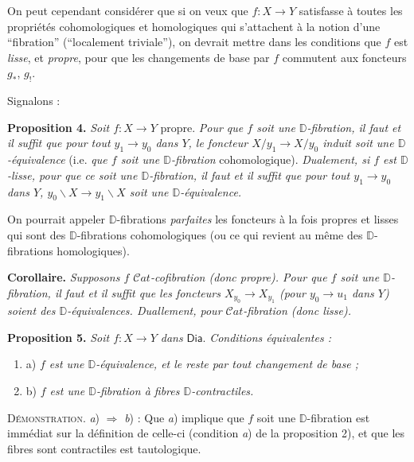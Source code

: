 \documentclass[11pt,leqno]{article}
\newcommand{\printedpage}[1]{\marginpar{\footnotesize p.~#1}}
\newcommand{\msp}[1]{\marginpar{\footnotesize [#1]}}
\newcommand{\DD}{\mathbb{D}}
\newcommand{\Dia}{\mathsf{Dia}}
\newcommand{\Cat}{\mathcal{C}at}
\begin{document}
\indent On peut cependant considérer que si on veux que $f : X \to Y$ satisfasse à toutes les propriétés cohomologiques et homologiques qui s'attachent à la notion d'une “fibration” (“localement triviale”), on devrait mettre dans les conditions que $f$ est \textit{lisse}, et \textit{propre}, pour que les changements de base par $f$ commutent aux foncteurs $g_*$, $g_!$. %

\printedpage{51}

\msp{page 83}

Signalons :

\textbf{Proposition 4.} \textit{Soit $f : X \to Y$} propre. \textit{Pour que $f$ soit une $\DD$-fibration, il faut et il suffit que pour tout $y_1 \to y_0$ dans $Y$, le foncteur $X/y_1 \to X/y_0$ induit soit une $\DD$-équivalence} (i.e. \textit{que $f$ soit une $\DD$-fibration} cohomologique). \textit{Dualement, si $f$ est $\DD$-lisse, pour que ce soit une $\DD$-fibration, il faut et il suffit que pour tout $y_1 \to y_0$ dans $Y$, $y_0\backslash X \to y_1\backslash X$ soit une $\DD$-équivalence.}

\indent On pourrait appeler $\DD$-fibrations \textit{parfaites} les foncteurs à la fois propres et lisses qui sont des $\DD$-fibrations cohomologiques (ou ce qui revient au même des $\DD$-fibrations homologiques).

\textbf{Corollaire.} \textit{Supposons $f$ $\Cat$-cofibration (donc propre). Pour que $f$ soit une $\DD$-fibration, il faut et il suffit que les foncteurs $X_{y_0} \to X_{y_1}$ (pour $y_0 \to u_1$ dans $Y$) soient des $\DD$-équivalences. Duallement, pour $\Cat$-fibration (donc lisse).} %

\textbf{Proposition 5.} \textit{Soit $f : X \to Y$ dans} $\Dia$. \textit{Conditions équivalentes :}
\begin{enumerate}[label={}, leftmargin=2em, labelsep=0pt]
\item a) \textit{$f$ est une $\DD$-équivalence, et le reste par tout changement de base ;}
\item b) \textit{$f$ est une $\DD$-fibration à fibres $\DD$-contractiles.}
\end{enumerate}

\textsc{Démonstration.} \textit{a}) $\Rightarrow$ \textit{b}) : Que \textit{a}) implique que $f$ soit une $\DD$-fibration est immédiat sur la définition de celle-ci (condition \textit{a}) de la proposition 2), et que les fibres sont contractiles est tautologique.
\end{document}
